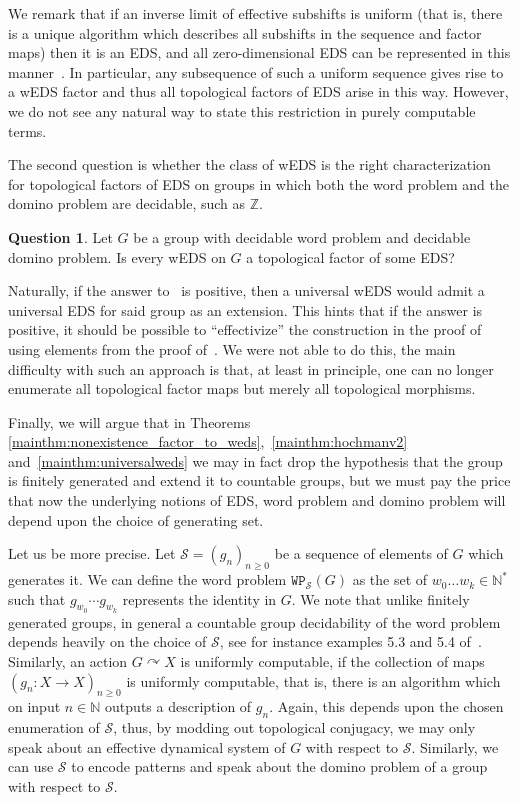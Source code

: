 \documentclass{article}
\theoremstyle{definition}
\newtheorem{question}[theorem]{Question}
\theoremstyle{plain}
\newcommand{\NN}{\mathbb{N}}
\newcommand{\ZZ}{\mathbb{Z}}
\begin{document}
We remark that if an inverse limit of effective subshifts is uniform (that is, there is a unique algorithm which describes all subshifts in the sequence and factor maps) then it is an EDS, and all zero-dimensional EDS can be represented in this manner~\cite[Section 4]{BarCarRoj2025}. In particular, any subsequence of such a uniform sequence gives rise to a wEDS factor and thus all topological factors of EDS arise in this way. However, we do not see any natural way to state this restriction in purely computable terms.

The second question is whether the class of wEDS is the right characterization for topological factors of EDS on groups in which both the word problem and the domino problem are decidable, such as $\ZZ$.

\begin{question}\label{ques:2}
    Let $G$ be a group with decidable word problem and decidable domino problem. Is every wEDS on $G$ a topological factor of some EDS? 
\end{question}

Naturally, if the answer to~ is positive, then a universal wEDS would admit a universal EDS for said group as an extension. This hints that if the answer is positive, it should be possible to ``effectivize'' the construction in the proof of~ using elements from the proof of~. We were not able to do this, the main difficulty with such an approach is that, at least in principle, one can no longer enumerate all topological factor maps but merely all topological morphisms. 

Finally, we will argue that in Theorems \ref{mainthm:nonexistence_factor_to_weds},~\ref{mainthm:hochmanv2} and~\ref{mainthm:universalweds} we may in fact drop the hypothesis that the group is finitely generated and extend it to countable groups, but we must pay the price that now the underlying notions of EDS, word problem and domino problem will depend upon the choice of generating set. 

Let us be more precise. Let $
\mathcal{S}= (g_n)_{n \geq 0}$ be a sequence of elements of $G$ which generates it. We can define the word problem $\texttt{WP}_{\mathcal{S}}(G)$ as the set of $w_0\dots w_k \in \NN^*$ such that $g_{w_0}\cdots g_{w_k}$ represents the identity in $G$. We note that unlike finitely generated groups, in general a countable group decidability of the word problem depends heavily on the choice of $\mathcal{S}$, see for instance examples 5.3 and 5.4 of~\cite{barbierilemp:tel-01563302}. Similarly, an action $G\curvearrowright X$ is uniformly computable, if the collection of maps $(g_n\colon X \to X)_{n \geq 0}$ is uniformly computable, that is, there is an algorithm which on input $n \in \NN$ outputs a description of $g_n$. Again, this depends upon the chosen enumeration of $\mathcal{S}$, thus, by modding out topological conjugacy, we may only speak about an effective dynamical system of $G$ with respect to $\mathcal{S}$. Similarly, we can use $\mathcal{S}$ to encode patterns and speak about the domino problem of a group with respect to $\mathcal{S}$. 
\end{document}
